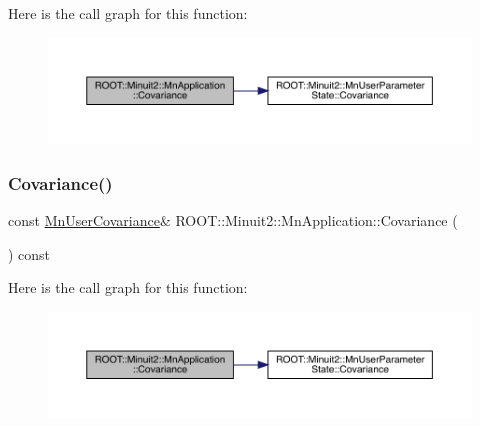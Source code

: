 Here is the call graph for this function\+:
\nopagebreak
\begin{figure}[H]
\begin{center}
\leavevmode
\includegraphics[width=350pt]{df/dd5/classROOT_1_1Minuit2_1_1MnApplication_abd83494a6b9b808683edc162c28a9888_cgraph}
\end{center}
\end{figure}
\mbox{\label{classROOT_1_1Minuit2_1_1MnApplication_abd83494a6b9b808683edc162c28a9888}} 
\subsubsection{\texorpdfstring{Covariance()}{Covariance()}\hspace{0.1cm}{\footnotesize\ttfamily [3/3]}}
{\footnotesize\ttfamily const \mbox{\hyperlink{classROOT_1_1Minuit2_1_1MnUserCovariance}{Mn\+User\+Covariance}}\& R\+O\+O\+T\+::\+Minuit2\+::\+Mn\+Application\+::\+Covariance (\begin{DoxyParamCaption}{ }\end{DoxyParamCaption}) const\hspace{0.3cm}{\ttfamily [inline]}}

Here is the call graph for this function\+:
\nopagebreak
\begin{figure}[H]
\begin{center}
\leavevmode
\includegraphics[width=350pt]{df/dd5/classROOT_1_1Minuit2_1_1MnApplication_abd83494a6b9b808683edc162c28a9888_cgraph}
\end{center}
\end{figure}
\mbox{\label{classROOT_1_1Minuit2_1_1MnApplication_aedc3775627672ba2038e8a26d6df13f1}} 
